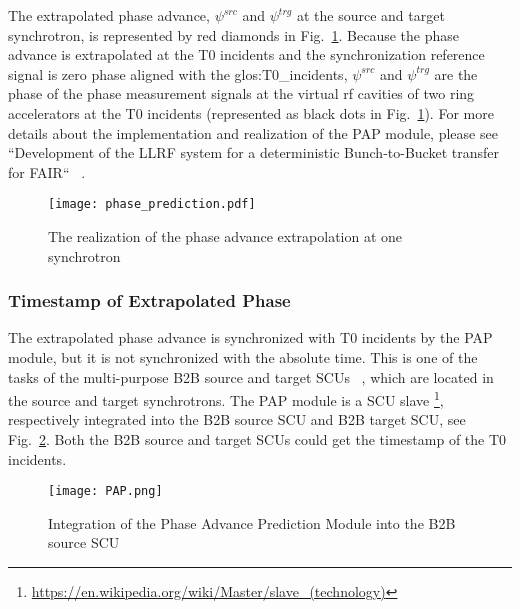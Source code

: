 The extrapolated phase advance, $\psi^\mathit{src}$ and $\psi^\mathit{trg}$ at the source and target synchrotron, is represented by red diamonds in Fig.~\ref{phase_prediction1}. Because the phase advance is extrapolated at the T0 incidents and the synchronization reference signal is zero phase aligned with the \gls{glos:T0_incidents}, $\psi^\mathit{src}$ and $\psi^\mathit{trg}$ are the phase of the phase measurement signals at the virtual rf cavities of two ring accelerators at the T0 incidents (represented as black dots in Fig.~\ref{phase_prediction1}). For more details about the implementation and realization of the PAP module, please see ``Development of the LLRF system for a deterministic Bunch-to-Bucket transfer for FAIR`` ~\cite{ferrand_development_????}.   
\begin{figure}[!htb]
   \centering   
   \texttt{[image: phase\_prediction.pdf]}
   \caption{The realization of the phase advance extrapolation at one synchrotron}
   \label{phase_prediction1}
\end{figure}
\subsubsection{Timestamp of Extrapolated Phase}
The extrapolated phase advance is synchronized with T0 incidents by the PAP module, but it is not synchronized with the absolute time. This is one of the tasks of the multi-purpose B2B source and target SCUs ~\cite{beck_new_2012, thieme_scu_2013}, which are located in the source and target synchrotrons. The PAP module is a SCU slave \footnote{\url{https://en.wikipedia.org/wiki/Master/slave_(technology)}}, respectively integrated into the B2B source SCU and B2B target SCU, see Fig.~\ref{PAP}. Both the B2B source and target SCUs could get the timestamp of the T0 incidents. 
 \begin{figure}[!htb]
   \centering   
   \texttt{[image: PAP.png]}
   \caption{Integration of the Phase Advance Prediction Module into the B2B source SCU}
   \label{PAP}
\end{figure}

